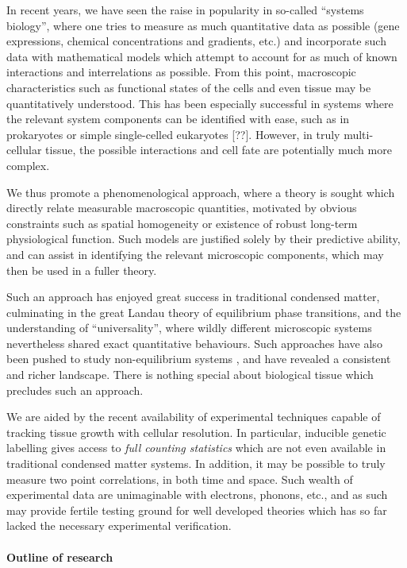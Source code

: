 \documentclass[10pt,english]{report}
\begin{document}
In recent years, we have seen the raise in popularity in so-called ``systems biology'', where one tries to measure as much quantitative data as possible (gene expressions, chemical concentrations and gradients, etc.) and incorporate such data with mathematical models which attempt to account for as much of known interactions and interrelations as possible. From this point, macroscopic characteristics such as functional states of the cells and even tissue may be quantitatively understood. This has been especially successful in systems where the relevant system components can be identified with ease, such as in prokaryotes or simple single-celled eukaryotes [??]. However, in truly multi-cellular tissue, the possible interactions and cell fate are potentially much more complex.

We thus promote a phenomenological approach, where a theory is sought which directly relate measurable macroscopic quantities, motivated by obvious constraints such as spatial homogeneity or existence of robust long-term physiological function. Such models are justified solely by their predictive ability, and can assist in identifying the relevant microscopic components, which may then be used in a fuller theory.

Such an approach has enjoyed great success in traditional condensed matter, culminating in the great Landau theory of equilibrium phase transitions, and the understanding of ``universality'', where wildly different microscopic systems nevertheless shared exact quantitative behaviours. Such approaches have also been pushed to study non-equilibrium systems \citet[chapter 10]{cardybook}, and have revealed a consistent and richer landscape. There is nothing special about biological tissue which precludes such an approach.

We are aided by the recent availability of experimental techniques capable of tracking tissue growth with cellular resolution. In particular, inducible genetic labelling gives access to \emph{full counting statistics} which are not even available in traditional condensed matter systems. In addition, it may be possible to truly measure two point correlations, in both time and space. Such wealth of experimental data are unimaginable with electrons, phonons, etc., and as such may provide fertile testing ground for well developed theories which has so far lacked the necessary experimental verification.

\paragraph{Outline of research}
\end{document}
